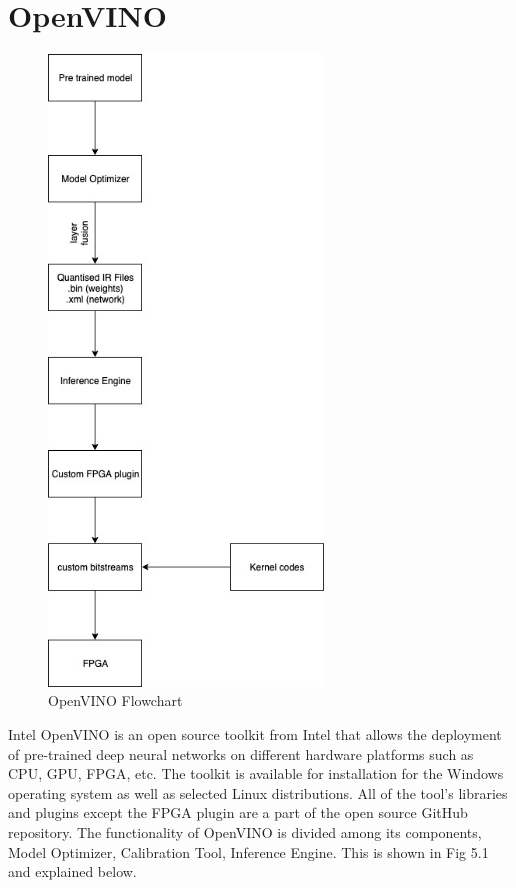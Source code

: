 \documentclass[titlepage]{report}
\begin{document}
\section{OpenVINO}
\begin{figure}[!]
    \centering
    \includegraphics[width=0.65\textwidth,left]{open_vino_flowchart.jpg}
    \caption{OpenVINO Flowchart}
\end{figure}

Intel OpenVINO is an open source toolkit from Intel that allows the deployment of pre-trained deep neural networks on different hardware platforms such as CPU, GPU, FPGA, etc. The toolkit is available for installation for the Windows operating system as well as selected Linux distributions. All of the tool's libraries and plugins except the FPGA plugin are a part of the open source GitHub repository.
The functionality of OpenVINO is divided among its components, Model Optimizer, Calibration Tool, Inference Engine. This is shown in Fig 5.1 and explained below. 
\end{document}
